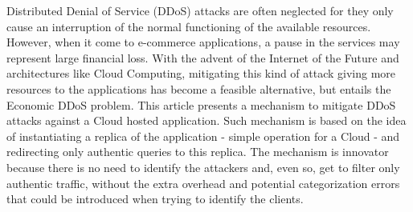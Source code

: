 
Distributed Denial of Service (DDoS) attacks are often neglected for they only cause an interruption of the normal functioning of the available resources. However, when it come to e-commerce applications, a pause in the services may represent large financial loss. With the advent of the Internet of the Future and architectures like Cloud Computing, mitigating this kind of attack giving more resources to the applications has become a feasible alternative, but entails the Economic DDoS problem. This article presents a mechanism to mitigate DDoS attacks against a Cloud hosted application. Such mechanism is based on the idea of instantiating a replica of the application - simple operation for a Cloud - and redirecting only authentic queries to this replica. The mechanism is innovator because there is no need to identify the attackers and, even so, get to filter only authentic traffic, without the extra overhead and potential categorization errors that could be introduced when trying to identify the clients.